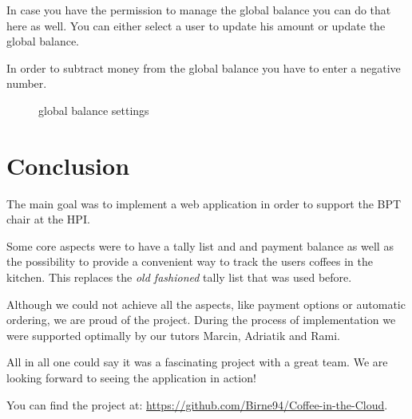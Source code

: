 In case you have the permission to manage the global balance you can do
that here as well. You can either select a user to update his amount or
update the global balance.

In order to subtract money from the global balance you have to enter a
negative number.

\begin{figure}[htbp]
\centering
{}
\caption{global balance settings}
\end{figure}

\newpage
\newpage
\section{Conclusion}\label{conclusion}

The main goal was to implement a web application in order to support the
BPT chair at the HPI.

Some core aspects were to have a tally list and and payment balance
as well as the possibility to provide a convenient way to track the users
coffees in the kitchen. This replaces the \emph{old fashioned} tally
list that was used before.

Although we could not achieve all the aspects, like payment options or
automatic ordering, we are proud of the project. During the process of
implementation we were supported optimally by our tutors Marcin,
Adriatik and Rami.

All in all one could say it was a fascinating project with a great team.
We are looking forward to seeing the application in action!

\vspace{2cm}

You can find the project at: \href{https://github.com/Birne94/Coffee-in-the-Cloud}{https://github.com/Birne94/Coffee-in-the-Cloud}.
